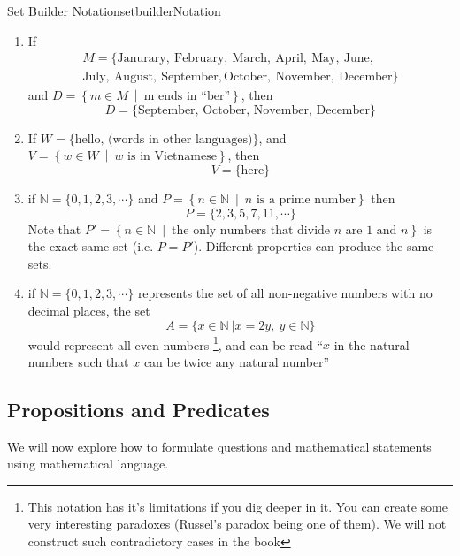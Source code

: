 \documentclass{book}
\newcommand{\N}{{\mathbb{N}}}
\newcommand{\set}[2]{\left\{#1 \ \middle|\ #2\right\}}
\begin{document}
\begin{example}{Set Builder Notation}{setbuilderNotation}
	\begin{enumerate}
		\item If
			\begin{gather*}
				M = \{ \text{Janurary},\ \text{February},\ \text{March},\ \text{April},\ \text{May},\ \text{June},\\
					\text{July},\ \text{August},\ \text{September}, \text{October},\ \text{November},\ \text{December}\}
			\end{gather*}
			and $D = \set{m \in M}{\text{m ends in ``ber''}}$, then
			\[
				D = \{\text{September, October, November, December}\}
			\]
		\item If $W = \{\text{hello, (words in other languages)}\} $, and $V = \set{w \in W}{\text{$w$ is in
			Vietnamese}}$, then
			\[
				V = \{\text{here}\}
			\]
		\item if $\N = \{0,1,2,3,\cdots\}$ and $P = \set{n \in \N}{\text{$n$ is a prime number}}$ then
			\[
				P = \{2,3,5,7,11,\cdots\}
			\]
			Note that $P' = \set{n \in \N}{\text{the only numbers that divide $n$ are $1$ and $n$}}$ is the exact same
			set (i.e. $P = P'$). Different properties can produce the same sets.
		\item if $\N = \{0,1,2,3,\cdots\}$ represents the
set of all non-negative numbers with no decimal places, the set
\[
	A = \{x \in \N\ | x = 2y,\ y \in \N\}
\]
would represent all even numbers \footnote{This notation has it's limitations if you dig deeper in it. You can
create some very interesting paradoxes (Russel's paradox being one of them). We will not construct such contradictory
cases in the book}, and can be read ``$x$ in the natural numbers such that $x$ can be twice any natural number''
	\end{enumerate}

\end{example}

\subsection{Propositions and Predicates}\label{sec:propositions}

We will now explore how to formulate questions and mathematical statements using mathematical language.
\end{document}
